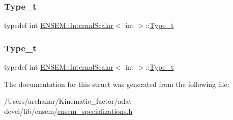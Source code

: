 \subsubsection{\texorpdfstring{Type\_t}{Type\_t}\hspace{0.1cm}{\footnotesize\ttfamily [2/3]}}
{\footnotesize\ttfamily typedef int \mbox{\hyperlink{structENSEM_1_1InternalScalar}{E\+N\+S\+E\+M\+::\+Internal\+Scalar}}$<$ int $>$\+::\mbox{\hyperlink{structENSEM_1_1InternalScalar_3_01int_01_4_a5814154ceb365d4ebbd319bcace78528}{Type\+\_\+t}}}

\mbox{\label{structENSEM_1_1InternalScalar_3_01int_01_4_a5814154ceb365d4ebbd319bcace78528}} 
\subsubsection{\texorpdfstring{Type\_t}{Type\_t}\hspace{0.1cm}{\footnotesize\ttfamily [3/3]}}
{\footnotesize\ttfamily typedef int \mbox{\hyperlink{structENSEM_1_1InternalScalar}{E\+N\+S\+E\+M\+::\+Internal\+Scalar}}$<$ int $>$\+::\mbox{\hyperlink{structENSEM_1_1InternalScalar_3_01int_01_4_a5814154ceb365d4ebbd319bcace78528}{Type\+\_\+t}}}



The documentation for this struct was generated from the following file\+:\begin{DoxyCompactItemize}
\item 
/\+Users/archanar/\+Kinematic\+\_\+factor/adat-\/devel/lib/ensem/\mbox{\hyperlink{adat-devel_2lib_2ensem_2ensem__specializations_8h}{ensem\+\_\+specializations.\+h}}\end{DoxyCompactItemize}
